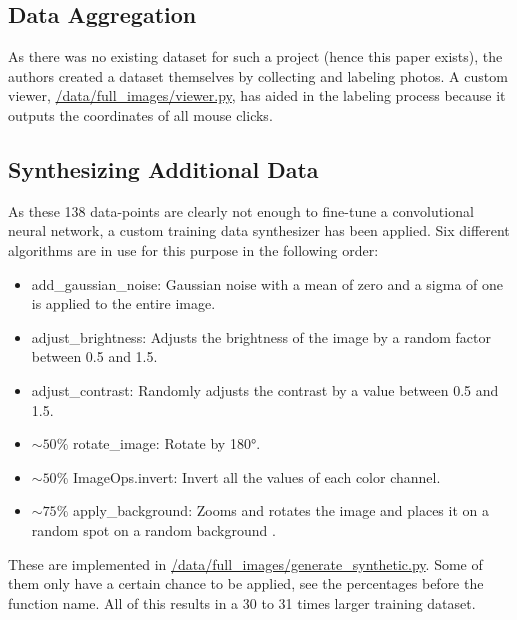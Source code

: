 \documentclass[a4paper,11pt]{report}
\begin{document}
            \subsection{Data Aggregation}
                As there was no existing dataset for such a project (hence this paper exists), the authors created a dataset themselves by collecting and labeling photos. A custom viewer, \href{https://github.com/lenamerkli/ingredient-scanner/tree/main/data/full_images/frames_json}{/data/full\_images/viewer.py}, has aided in the labeling process because it outputs the coordinates of all mouse clicks.
                
            \subsection{Synthesizing Additional Data}
                As these 138 data-points are clearly not enough to fine-tune a convolutional neural network, a custom training data synthesizer has been applied. Six different algorithms are in use for this purpose in the following order:
                \begin{itemize}
                    \item add\_gaussian\_noise: Gaussian noise \cite{gaussian-noise} with a mean of zero and a sigma of one is applied to the entire image.
                    \item adjust\_brightness: Adjusts the brightness of the image by a random factor between 0.5 and 1.5.
                    \item adjust\_contrast: Randomly adjusts the contrast by a value between 0.5 and 1.5.
                    \item $\sim 50\%$ rotate\_image: Rotate by 180°.
                    \item $\sim 50\%$ ImageOps.invert: Invert all the values of each color channel.
                    \item $\sim 75\%$ apply\_background: Zooms and rotates the image and places it on a random spot on a random background \cite{indoorCVPR_09}.
                \end{itemize}
                These are implemented in \href{https://github.com/lenamerkli/ingredient-scanner/blob/main/data/full_images/generate_synthetic.py}{/data/full\_images/generate\_synthetic.py}. Some of them only have a certain chance to be applied, see the percentages before the function name. All of this results in a 30 to 31 times larger training dataset.
                
\end{document}
